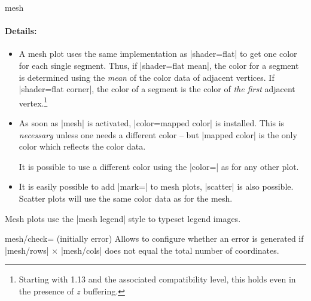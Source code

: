 {\begin{plottype}[/pgfplots]{mesh}
    \paragraph{Details:}

    \begin{itemize}
        \item A mesh plot uses the same implementation as |shader=flat| to
            get one color for each single segment. Thus, if
            |shader=flat mean|, the color for a segment is determined using
            the \emph{mean} of the color data of adjacent vertices. If
            |shader=flat corner|, the color of a segment is the color of
            \emph{the first} adjacent vertex.\footnote{Starting with
            \PGFPlots{} 1.13 and the associated compatibility level, this
            holds even in the presence of $z$ buffering.}
        \item As soon as |mesh| is activated, |color=mapped color| is
            installed. This is \emph{necessary} unless one needs a different
            color -- but |mapped color| is the only color which reflects the
            color data.

            It is possible to use a different color using the
            |color=| as for any other plot.
        \item It is easily possible to add |mark=| to mesh
            plots, |scatter| is also possible. Scatter plots will use the
            same color data as for the mesh.
    \end{itemize}

\pgfplotsexpensiveexample
\begin{codeexample}[]
\end{codeexample}

    Mesh plots use the |mesh legend| style to typeset legend images.
\end{plottype}

\begin{pgfplotskey}{mesh/check= (initially error)}
    Allows to configure whether an error is generated if |mesh/rows| $\times$
    |mesh/cols| does not equal the total number of coordinates.


\end{pgfplotskey}}
